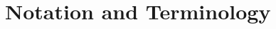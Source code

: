 \documentclass{article}
\theoremstyle{plain}
\theoremstyle{plain}
\newtheorem*{remark}{Remark}
\begin{document}


\section{Notation and Terminology}
\end{document}
